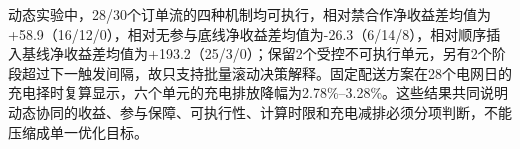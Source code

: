 动态实验中，28/30个订单流的四种机制均可执行，相对禁合作净收益差均值为+58.9（16/12/0），相对无参与底线净收益差均值为-26.3（6/14/8），相对顺序插入基线净收益差均值为+193.2（25/3/0）；保留2个受控不可执行单元，另有2个阶段超过下一触发间隔，故只支持批量滚动决策解释。固定配送方案在28个电网日的充电择时复算显示，六个单元的充电排放降幅为2.78\%--3.28\%。这些结果共同说明动态协同的收益、参与保障、可执行性、计算时限和充电减排必须分项判断，不能压缩成单一优化目标。
